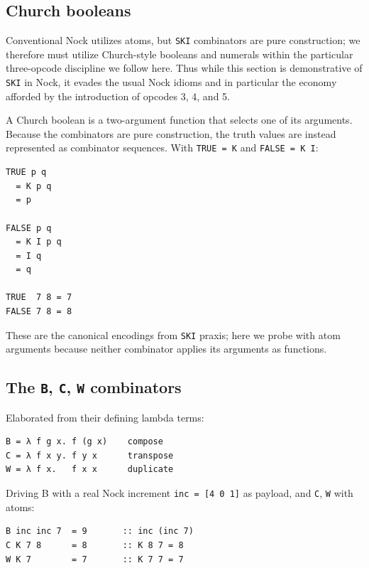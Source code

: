 \documentclass[twoside]{article}
\begin{document}
\subsection{Church booleans}

Conventional Nock utilizes atoms, but \texttt{SKI} combinators are pure construction; we therefore must utilize Church-style booleans and numerals within the particular three-opcode discipline we follow here.  Thus while this section is demonstrative of \texttt{SKI} in Nock, it evades the usual Nock idioms and in particular the economy afforded by the introduction of opcodes 3, 4, and 5.

A Church boolean is a two-argument function that selects one of its arguments.  Because the combinators are pure construction, the truth values are instead represented as combinator sequences.  With \lstinline[style=inlinecode]{TRUE = K} and \lstinline[style=inlinecode]{FALSE = K I}:

\begin{lstlisting}[style=listingblock]
TRUE p q
  = K p q
  = p

FALSE p q
  = K I p q
  = I q
  = q

TRUE  7 8 = 7
FALSE 7 8 = 8
\end{lstlisting}

\noindent
These are the canonical encodings from \texttt{SKI} praxis; here we probe with atom arguments because neither combinator applies its arguments as functions.

\subsection{The \texttt{B}, \texttt{C}, \texttt{W} combinators}

Elaborated from their defining lambda terms:

\begin{lstlisting}[style=listingblock]
B = λ f g x. f (g x)    compose
C = λ f x y. f y x      transpose
W = λ f x.   f x x      duplicate
\end{lstlisting}

Driving B with a real Nock increment \lstinline[style=inlinecode]{inc = [4 0 1]} as payload, and \texttt{C}, \texttt{W} with atoms:

\begin{lstlisting}[style=listingblock]
B inc inc 7  = 9       :: inc (inc 7)
C K 7 8      = 8       :: K 8 7 = 8
W K 7        = 7       :: K 7 7 = 7
\end{lstlisting}
\end{document}
